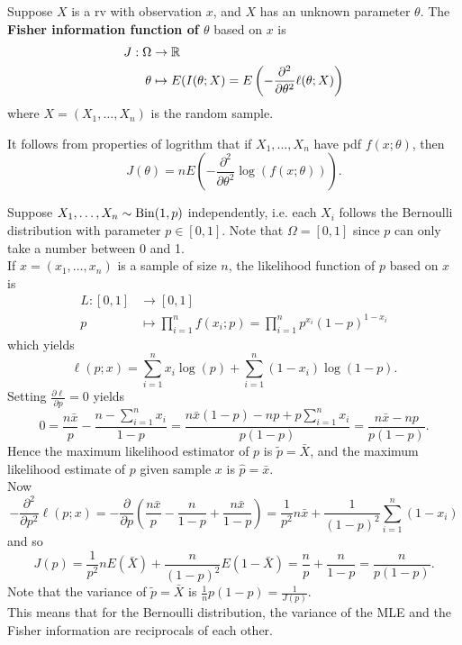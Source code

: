 \documentclass[11pt,fleqn]{book} %
\begin{document}
\begin{definition} \label{def:534}
Suppose \(X\) is a rv with observation \(x\), and \(X\) has an unknown parameter \(\theta\). The \textbf{Fisher information function of \(\theta\)} based on \(x\) is
\[
\begin{aligned}
J: \Omega &\rightarrow \mathbb{R} \\
\theta&\mapsto E(I(\theta; X) = E\left(-\frac{\partial^2}{\partial\theta^2}\ell(\theta; X)\right)
\end{aligned}
\]
where \(X = (X_1, \ldots, X_n)\) is the random sample.
\end{definition}

\begin{remark} \label{rmk:535}
It follows from properties of logrithm that if \(X_1, \ldots, X_n\) have pdf \(f(x; \theta)\), then
\[
J(\theta) = nE\left(-\frac{\partial^2}{\partial\theta^2}\log(f(x; \theta))\right).
\]
\end{remark}

\begin{example} \label{eg:536}
Suppose \(X_1, \ldots, X_n \sim \operatorname{Bin}(1, p)\) independently, i.e. each \(X_i\) follows the Bernoulli distribution with parameter \(p \in [0, 1]\). Note that \(\Omega = [0, 1]\) since \(p\) can only take a number between 0 and 1. \\
\indent If \(x = (x_1, \ldots, x_n)\) is a sample of size \(n\), the likelihood function of \(p\) based on \(x\) is
\[
\begin{aligned}
L: [0, 1] &\rightarrow [0, 1] \\
p &\mapsto \prod_{i=1}^n f(x_i; p) = \prod_{i=1}^n p^{x_i}(1 - p)^{1 - x_i}
\end{aligned}
\]
which yields
\[
\ell(p; x) = \sum_{i=1}^n x_i \log(p) + \sum_{i=1}^n (1 - x_i)\log(1 - p).
\]
\indent Setting \(\frac{\partial\ell}{\partial p} = 0\) yields
\[
0 = \frac{n\bar{x}}{p} - \frac{n - \sum_{i=1}^n x_i}{1 - p} = \frac{n\bar{x}(1 - p) - np + p\sum_{i=1}^n x_i}{p(1 - p)} = \frac{n\bar{x} - np}{p(1 - p)}.
\]
\indent Hence the maximum likelihood estimator of \(p\) is \(\tilde{p} = \bar{X}\), and the maximum likelihood estimate of \(p\) given sample \(x\) is \(\hat{p} = \bar{x}\). \\
\indent Now
\[
-\frac{\partial^2}{\partial p^2}\ell(p; x) = -\frac{\partial}{\partial p}\left(\frac{n\bar{x}}{p} - \frac{n}{1 - p} + \frac{n\bar{x}}{1 - p}\right) = \frac{1}{p^2}n\bar{x} + \frac{1}{(1 - p)^2}\sum_{i=1}^n(1 - x_i)
\]
and so
\[
J(p) = \frac{1}{p^2}nE(\bar{X}) + \frac{n}{(1 - p)^2}E(1 - \bar{X}) = \frac{n}{p} + \frac{n}{1 - p} = \frac{n}{p(1 - p)}.
\]
\indent Note that the variance of \(\tilde{p} = \bar{X}\) is \(\frac1n p(1 - p) = \frac{1}{J(p)}\). \\
\indent This means that for the Bernoulli distribution, the variance of the MLE and the Fisher information are reciprocals of each other.
\end{example}
\end{document}
